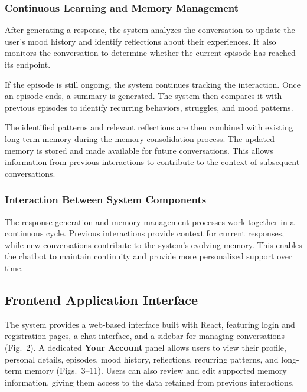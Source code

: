 \documentclass[conference]{IEEEtran}
\begin{document}
\subsubsection{Continuous Learning and Memory Management}

After generating a response, the system analyzes the conversation to update the user's mood history and identify reflections about their experiences. It also monitors the conversation to determine whether the current episode has reached its endpoint.

If the episode is still ongoing, the system continues tracking the interaction. Once an episode ends, a summary is generated. The system then compares it with previous episodes to identify recurring behaviors, struggles, and mood patterns.

The identified patterns and relevant reflections are then combined with existing long-term memory during the memory consolidation process. The updated memory is stored and made available for future conversations. This allows information from previous interactions to contribute to the context of subsequent conversations.

\subsubsection{Interaction Between System Components}

The response generation and memory management processes work together in a continuous cycle. Previous interactions provide context for current responses, while new conversations contribute to the system's evolving memory. This enables the chatbot to maintain continuity and provide more personalized support over time.

\subsection{Frontend Application Interface}

The system provides a web-based interface built with React, featuring login and registration pages, a chat interface, and a sidebar for managing conversations (Fig.~2). A dedicated \textbf{Your Account} panel allows users to view their profile, personal details, episodes, mood history, reflections, recurring patterns, and long-term memory (Figs.~3--11). Users can also review and edit supported memory information, giving them access to the data retained from previous interactions.
\end{document}
